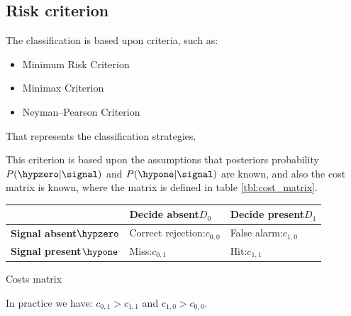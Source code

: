 \subsection{Risk criterion}
The classification is based upon criteria, such as:
\begin{itemize}
\item Minimum Risk Criterion
\item Minimax Criterion
\item Neyman--Pearson Criterion
\end{itemize}
That represents the classification strategies.

This criterion is based upon the assumptions that posteriors probability ${P(\hypzero|\signal)}$ and ${P(\hypone|\signal)}$ are known, and also the cost matrix is known, where the matrix is defined in table \ref{tbl:cost_matrix}.
\begin{margintable}
	\renewcommand{\arraystretch}{1}
	\begin{centering} 
		\begin{tabular}{>{\centering} m{1.25cm} <{\centering} | >{\centering} m{1.25cm} <{\centering} >{\centering} m{1.25cm} <{\centering}}
		\hline										& \scriptsize{\textbf{Decide absent}\newline$D_0$} & \scriptsize{\textbf{Decide present}\newline$D_1$} \tabularnewline \hline
		\scriptsize{\textbf{Signal absent}\newline$\hypzero$}  	& \cellcolor{lgray}\scriptsize{Correct rejection:\newline$c_{0,0}$} & \cellcolor{dgray}\scriptsize{False alarm:\newline$c_{1,0}$}        \tabularnewline
		\scriptsize{\textbf{Signal present}\newline$\hypone$} 	& \cellcolor{dgray}\scriptsize{Miss:\newline$c_{0,1}$}              & \cellcolor{lgray}\scriptsize{Hit:\newline$c_{1,1}$}                \tabularnewline \hline
		\end{tabular}
	\end{centering} 
	\renewcommand{\arraystretch}{1.75}
	\caption{Costs matrix}
	\label{tbl:cost_matrix}
\end{margintable}
In practice we have: ${c_{0,1} > c_{1,1}}$ and ${c_{1,0} > c_{0,0}}$.

